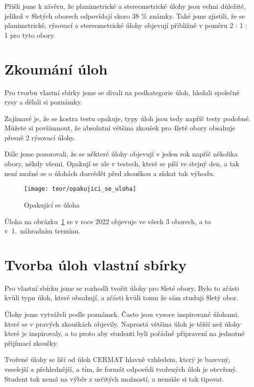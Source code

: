 Přišli jsme k závěru, že planimetrické a stereometrické úlohy jsou velmi důležité, jelikož v 8letých oborech odpovídají skoro 38 \% známky. Také jsme zjistili, že se planimetrické, rýsovací a stereometrické úlohy objevují přibližně v poměru 2 : 1 : 1 pro tyto obory.




\section{Zkoumání úloh}

Pro tvorbu vlastní sbírky jsme se dívali na podkategorie úloh, hledali společné rysy a dělali si poznámky.

Zajímavé je, že se kostra testu opakuje, typy úloh jsou tedy napříč testy podobné. Můžete si povšimnout, že absolutní většina zkoušek pro 4leté obory obsahuje přesně 2 rýsovací úlohy.

Dále jsme pozorovali, že se některé úlohy objevují v jeden rok napříč několika obory, někdy všemi. Opakují se ale v testech, které se píší ve stejný den, a tak není možné se o úlohách dozvědět před zkouškou a získat tak výhodu.


\begin{figure}[h]
    \centering
    \texttt{[image: teor/opakujici\_se\_uloha]}
    \caption{Opakující se úloha ~\cite{CERMAT_pdfka}}
    \label{fig:opak_uloha}
\end{figure}

Úloha na obrázku~\ref{fig:opak_uloha} se v roce 2022 objevuje ve všech 3 oborech, a to v~1.~náhradním termínu.


\section{Tvorba úloh vlastní sbírky}

Pro vlastní sbírku jsme se rozhodli tvořit úlohy pro 8leté obory. Bylo to zčásti kvůli typu úloh, které obsahují, a zčásti kvůli tomu že sám studuji 8letý obor.

Úlohy jsme vytvářeli podle poznámek. Často jsou vysoce inspirované úlohami, které se v pravých zkouškách objevily. Naprostá většina úloh je těžší než úlohy které je inspirovaly, a to proto aby studenti byli pořádně připravení na jednotné přijímací zkoušky.

Tvořené úlohy se liší od úloh CERMAT hlavně vzhledem, který je barevný, veselejší a přehlednější, a tím, že formát odpovědi tvořených úloh je otevřený. Student tak nemá na výběr z určitých možností, a nemůže si tak tipovat.

